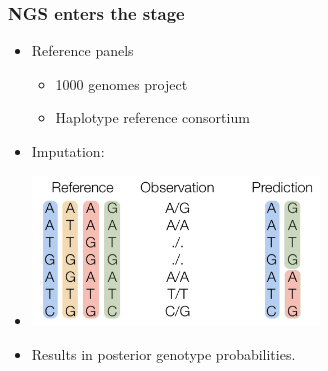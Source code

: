 \documentclass[xcolor=pdftex,dvipsnames,table,10pt]{beamer}
\begin{document}


\begin{frame}
  \frametitle{NGS enters the stage}
\begin{itemize}
\item Reference panels
\begin{itemize}
\item 1000 genomes project
\item Haplotype reference consortium
\end{itemize}
\item Imputation:
\item[] \includegraphics[width=0.6\textwidth]{imputation_illustration.png} 
\item Results in posterior genotype probabilities. 
\end{itemize}
\end{frame}
\end{document}

